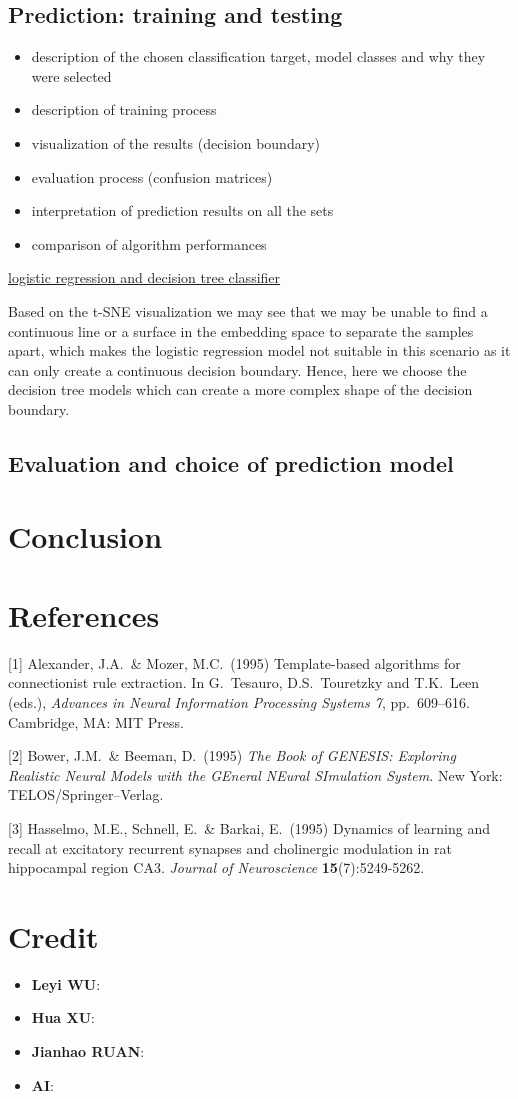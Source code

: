 \documentclass{article}
\begin{document}
\subsection{Prediction: training and testing}

\begin{itemize}
    \item description of the chosen classification target, model classes and why they were selected
    \item description of training process
    \item visualization of the results (decision boundary)
    \item evaluation process (confusion matrices)
    \item interpretation of prediction results on all the sets
    \item comparison of algorithm performances
\end{itemize}

\underline{logistic regression and decision tree classifier}

Based on the t-SNE visualization we may see that we may be unable to find a continuous line or a surface in the embedding space to separate the samples apart, which makes the logistic regression model not suitable in this scenario as it can only create a continuous decision boundary. Hence, here we choose the decision tree models which can create a more complex shape of the decision boundary.

\subsection{Evaluation and choice of prediction model}


\section{Conclusion}
\label{conclusion}

\section*{References}
{
\small


[1] Alexander, J.A.\ \& Mozer, M.C.\ (1995) Template-based algorithms for
connectionist rule extraction. In G.\ Tesauro, D.S.\ Touretzky and T.K.\ Leen
(eds.), {\it Advances in Neural Information Processing Systems 7},
pp.\ 609--616. Cambridge, MA: MIT Press.


[2] Bower, J.M.\ \& Beeman, D.\ (1995) {\it The Book of GENESIS: Exploring
  Realistic Neural Models with the GEneral NEural SImulation System.}  New York:
TELOS/Springer--Verlag.


[3] Hasselmo, M.E., Schnell, E.\ \& Barkai, E.\ (1995) Dynamics of learning and
recall at excitatory recurrent synapses and cholinergic modulation in rat
hippocampal region CA3. {\it Journal of Neuroscience} {\bf 15}(7):5249-5262.
}

\section*{Credit}
\begin{itemize}
    \item \textbf{Leyi WU}: 
    \item \textbf{Hua XU}: 
    \item \textbf{Jianhao RUAN}:
    \item \textbf{AI}:

\end{itemize}
\end{document}
